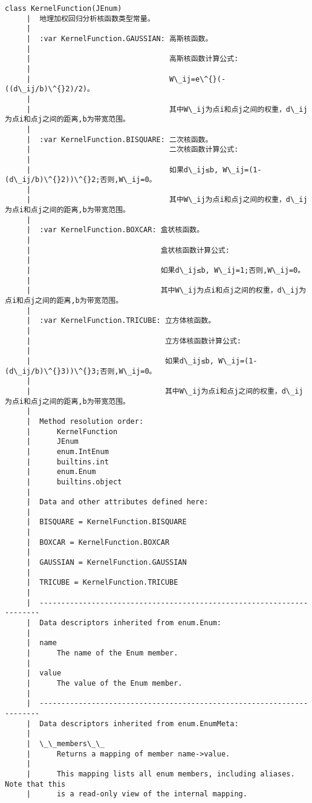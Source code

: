 \documentclass[11pt]{article}
\begin{document}
\begin{Verbatim}[commandchars=\\\{\}]
    class KernelFunction(JEnum)
     |  地理加权回归分析核函数类型常量。
     |  
     |  :var KernelFunction.GAUSSIAN: 高斯核函数。
     |  
     |                                高斯核函数计算公式:
     |  
     |                                W\_ij=e\^{}(-((d\_ij/b)\^{}2)/2)。
     |  
     |                                其中W\_ij为点i和点j之间的权重，d\_ij为点i和点j之间的距离,b为带宽范围。
     |  
     |  :var KernelFunction.BISQUARE: 二次核函数。
     |                                二次核函数计算公式:
     |  
     |                                如果d\_ij≤b, W\_ij=(1-(d\_ij/b)\^{}2))\^{}2;否则,W\_ij=0。
     |  
     |                                其中W\_ij为点i和点j之间的权重，d\_ij为点i和点j之间的距离,b为带宽范围。
     |  
     |  :var KernelFunction.BOXCAR: 盒状核函数。
     |  
     |                              盒状核函数计算公式:
     |  
     |                              如果d\_ij≤b, W\_ij=1;否则,W\_ij=0。
     |  
     |                              其中W\_ij为点i和点j之间的权重，d\_ij为点i和点j之间的距离,b为带宽范围。
     |  
     |  :var KernelFunction.TRICUBE: 立方体核函数。
     |  
     |                               立方体核函数计算公式:
     |  
     |                               如果d\_ij≤b, W\_ij=(1-(d\_ij/b)\^{}3))\^{}3;否则,W\_ij=0。
     |  
     |                               其中W\_ij为点i和点j之间的权重，d\_ij为点i和点j之间的距离,b为带宽范围。
     |  
     |  Method resolution order:
     |      KernelFunction
     |      JEnum
     |      enum.IntEnum
     |      builtins.int
     |      enum.Enum
     |      builtins.object
     |  
     |  Data and other attributes defined here:
     |  
     |  BISQUARE = KernelFunction.BISQUARE
     |  
     |  BOXCAR = KernelFunction.BOXCAR
     |  
     |  GAUSSIAN = KernelFunction.GAUSSIAN
     |  
     |  TRICUBE = KernelFunction.TRICUBE
     |  
     |  ----------------------------------------------------------------------
     |  Data descriptors inherited from enum.Enum:
     |  
     |  name
     |      The name of the Enum member.
     |  
     |  value
     |      The value of the Enum member.
     |  
     |  ----------------------------------------------------------------------
     |  Data descriptors inherited from enum.EnumMeta:
     |  
     |  \_\_members\_\_
     |      Returns a mapping of member name->value.
     |      
     |      This mapping lists all enum members, including aliases. Note that this
     |      is a read-only view of the internal mapping.
    

\end{Verbatim}
\end{document}
